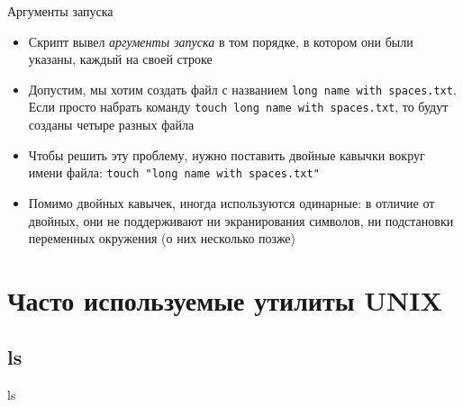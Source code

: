 \documentclass{beamer}
\begin{document}
\begin{frame}{Аргументы запуска}
	\begin{itemize}
		\item{Скрипт вывел \emph{аргументы запуска} в том порядке, в котором они были указаны, каждый на своей строке}\pause
		\item{Допустим, мы хотим создать файл с названием \texttt{long name with spaces.txt}. Если просто набрать команду \texttt{touch~long~name~with~spaces.txt}, то будут созданы четыре разных файла}\pause
		\item{Чтобы решить эту проблему, нужно поставить двойные кавычки вокруг имени файла: \texttt{touch~"long~name~with~spaces.txt"}}\pause
		\item{Помимо двойных кавычек, иногда используются одинарные: в отличие от двойных, они не поддерживают ни экранирования символов, ни подстановки переменных окружения (о них несколько позже)} 
	\end{itemize}
\end{frame}

\section{Часто используемые утилиты UNIX}

\subsection{ls}
\begin{frame}{\ttfamily ls}
\end{frame}
\end{document}
